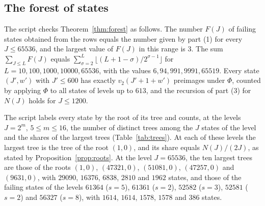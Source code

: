 \documentclass[11pt]{amsart}
\theoremstyle{definition}
\begin{document}
\subsection{The forest of states}
\label{subsec:forest-exp}
The script checks Theorem~\ref{thm:forest} as follows. The number $F(J)$ of failing states obtained from the rows equals the number given by part (1) for every $J\le65536$, and the largest value of $F(J)$ in this range is $3$. The sum $\sum_{J\le L}F(J)$ equals $\sum_{\sigma=2}^{L}\lfloor(L+1-\sigma)/2^{\sigma-1}\rfloor$ for $L=10,100,1000,10000,65536$, with the values $6,94,991,9991,65519$. Every state $(J',w')$ with $J'\le600$ has exactly $v_2(J'+1+w')$ preimages under $\Phi$, counted by applying $\Phi$ to all states of levels up to $613$, and the recursion of part (3) for $N(J)$ holds for $J\le1200$.

The script labels every state by the root of its tree and counts, at the levels $J=2^m$, $5\le m\le16$, the number of distinct trees among the $J$ states of the level and the shares of the largest trees (Table~\ref{tab:trees}). At each of these levels the largest tree is the tree of the root $(1,0)$, and its share equals $N(J)/(2J)$, as stated by Proposition~\ref{prop:roots}. At the level $J=65536$, the ten largest trees are those of the roots $(1,0)$, $(47321,0)$, $(51081,0)$, $(47257,0)$ and $(9631,0)$, with $29090$, $16376$, $6838$, $2810$ and $1962$ states, and those of the failing states of the levels $61364$ ($s=5$), $61361$ ($s=2$), $52582$ ($s=3$), $52581$ ($s=2$) and $56327$ ($s=8$), with $1614$, $1614$, $1578$, $1578$ and $386$ states.
\end{document}
